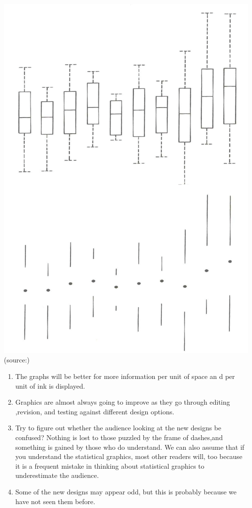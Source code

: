 \documentclass[]{book}
\providecommand{\tightlist}{%
  \setlength{\itemsep}{0pt}\setlength{\parskip}{0pt}}
\theoremstyle{definition}
\theoremstyle{definition}
\theoremstyle{definition}
\theoremstyle{remark}
\begin{document}
\includegraphics{images/Tufte_figure4.png} (source:\citep{Tufte_2001})

\begin{enumerate}
\def\labelenumi{\arabic{enumi}.}
\tightlist
\item
  The graphs will be better for more information per unit of space an d
  per unit of ink is displayed.
\item
  Graphics are almost always going to improve as they go through editing
  ,revision, and testing against different design options.
\item
  Try to figure out whether the audience looking at the new designs be
  confused? Nothing is lost to those puzzled by the frame of dashes,and
  something is gained by those who do understand. We can also assume
  that if you understand the statistical graphics, most other readers
  will, too because it is a frequent mistake in thinking about
  statistical graphics to underestimate the audience.
\item
  Some of the new designs may appear odd, but this is probably because
  we have not seen them before.
\end{enumerate}
\end{document}
